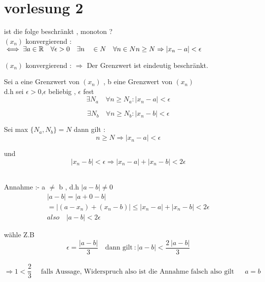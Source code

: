 \section{vorlesung 2}
\begin{text}
    ist die folge beschränkt , monoton ?\\

    $(x_n)$ konvergierend : $\iff \exists a \in\mathbb{R} \quad \forall \epsilon > 0 \quad \exists n \quad \in N \quad \forall n \in N \quad \\
    n \geq N \Rightarrow |x_n - a |< \epsilon $
\end{text}


\begin{theorem}

    $(x_n)$ konvergierend : $\Rightarrow$ Der Grenzwert ist eindeutig beschränkt.

\end{theorem}



\begin{beweis}
    Sei a eine Grenzwert von $(x_n)$ , b eine Grenzwert von $(x_n)$ \\
    d.h sei $\epsilon > 0$,$\epsilon$ beliebig , $\epsilon$ fest \\


    \begin{equation}
        \exists  N_a \quad \forall n \geq N_a : |x_n-a|< \epsilon
    \end{equation}
    

    \begin{equation}
        \exists  N_b \quad \forall n \geq N_b : |x_n-b|< \epsilon
    \end{equation}

    Sei max $\{N_a,N_b\}=N$
    dann gilt : \\
    \begin{equation}
        n \geq N \Rightarrow |x_n - a| < \epsilon
    \end{equation}
    
    und \begin{equation}
            |x_n -b| < \epsilon \Rightarrow |x_n -a|+|x_n - b|< 2\epsilon
    \end{equation}\\
\newpage    

    Annahme :- a $\neq$ b , d.h $|a-b|\neq 0 $
    \begin{gather*}
    |a-b|=|a+0-b|\\
    =|(a-x_n)+(x_n-b)| \leq |x_n - a|+|x_n-b|< 2 \epsilon \\
    also \quad |a - b|< 2 \epsilon
\end{gather*}

 
     wähle Z.B  \[\epsilon = \frac{|a-b|}{3}
        \quad
         \text{dann gilt}\ :|a-b|< \frac{2 \ |a-b|}{3}\]\\

        \[ \Rightarrow 1 < \frac{2}{3} \quad  \text{ falls  Aussage, Widerspruch  also  ist  die  Annahme  falsch  also  gilt }\ \quad a=b\]

\end{beweis}



